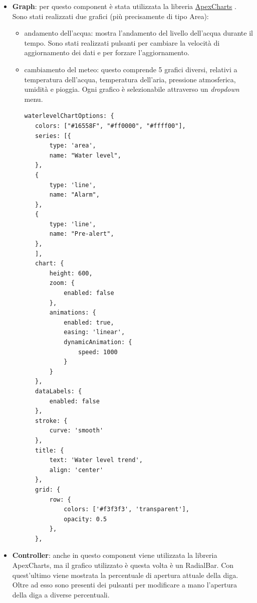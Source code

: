 \documentclass[a4paper,12pt]{report}
\newcommand{\apexcharts}{\href{https://apexcharts.com/}{ApexCharts} }
\begin{document}
\begin{itemize}
    \begin{verbatim}
 const viewer = new Viewer({
     container: document.querySelector('#viewer'),
     panorama: '...',
     defaultZoomLvl: 0,
     loadingImg: '...',
     navbar: [
     'zoom',
     'caption',
     'fullscreen',
     ],
     plugins: [
     [MarkersPlugin, {
         markers: [
         ...
         {
             id: 'image',
             imageLayer: '...',
             width: 240,
             height: 150,
             longitude: this.highPoint.lon,
             latitude: this.highPoint.lat,
             tooltip: 'Current level',
             orientation: 90
         },
         ]
     }]
     ]
 });
    \end{verbatim}
    
    \item \textbf{Graph}: per questo component è stata utilizzata la libreria \apexcharts. Sono stati realizzati due grafici (più precisamente di tipo Area):
    \begin{itemize}
        \item andamento dell'acqua: mostra l'andamento del livello dell'acqua durante il tempo. Sono stati realizzati pulsanti per cambiare la velocità di aggiornamento dei dati e per forzare l'aggiornamento.
        \item cambiamento del meteo: questo comprende 5 grafici diversi, relativi a temperatura dell'acqua, temperatura dell'aria, pressione atmosferica, umidità e pioggia. Ogni grafico è selezionabile attraverso un \emph{dropdown} menu.
        
       \begin{verbatim}
waterlevelChartOptions: {
   colors: ["#16558F", "#ff0000", "#ffff00"],
   series: [{
       type: 'area',
       name: "Water level",
   },
   {
       type: 'line',
       name: "Alarm",
   },
   {
       type: 'line',
       name: "Pre-alert",
   },
   ],
   chart: {
       height: 600,
       zoom: {
           enabled: false
       },
       animations: {
           enabled: true,
           easing: 'linear',
           dynamicAnimation: {
               speed: 1000
           }
       }
   },
   dataLabels: {
       enabled: false
   },
   stroke: {
       curve: 'smooth'
   },
   title: {
       text: 'Water level trend',
       align: 'center'
   },
   grid: {
       row: {
           colors: ['#f3f3f3', 'transparent'],
           opacity: 0.5
       },
   },
       \end{verbatim}
        
    \end{itemize}
    \item \textbf{Controller}: anche in questo component viene utilizzata la libreria ApexCharts, ma il grafico utilizzato è questa volta è un RadialBar. Con quest'ultimo viene mostrata la percentuale di apertura attuale della diga. Oltre ad esso sono presenti dei pulsanti per modificare a mano l'apertura della diga a diverse percentuali.
    

\end{itemize}
\end{document}
